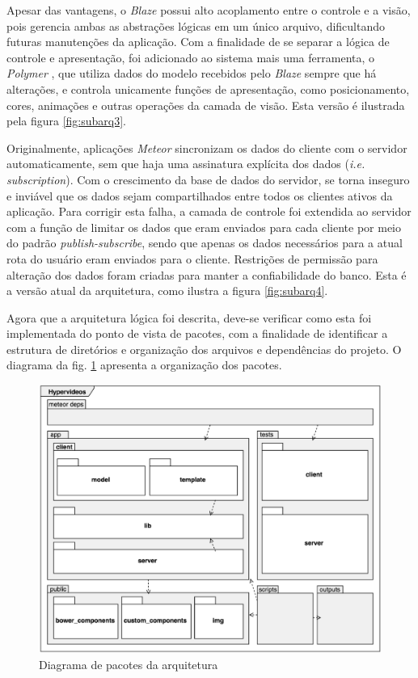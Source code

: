 Apesar das vantagens, o \textit{Blaze} possui alto acoplamento entre o controle e a visão, pois gerencia ambas as abstrações lógicas em um único arquivo, dificultando futuras manutenções da aplicação. Com a finalidade de se separar a lógica de controle e apresentação, foi adicionado ao sistema mais uma ferramenta, o \textit{Polymer} \cite{polymer2015}, que utiliza dados do modelo recebidos pelo \textit{Blaze} sempre que há alterações, e controla unicamente funções de apresentação, como posicionamento, cores, animações e outras operações da camada de visão. Esta versão é ilustrada pela figura \ref{fig:subarq3}.

Originalmente, aplicações \textit{Meteor} sincronizam os dados do cliente com o servidor automaticamente, sem que haja uma assinatura explícita dos dados (\textit{i.e. subscription}). Com o crescimento da base de dados do servidor, se torna inseguro e inviável que os dados sejam compartilhados entre todos os clientes ativos da aplicação. Para corrigir esta falha, a camada de controle foi extendida ao servidor com a função de limitar os dados que eram enviados para cada cliente por meio do padrão \textit{publish-subscribe}, sendo que apenas os dados necessários para a atual rota do usuário eram enviados para o cliente. Restrições de permissão para alteração dos dados foram criadas para manter a confiabilidade do banco. Esta é a versão atual da arquitetura, como ilustra a figura \ref{fig:subarq4}.

Agora que a arquitetura lógica foi descrita, deve-se verificar como esta foi implementada do ponto de vista de pacotes, com a finalidade de identificar a estrutura de diretórios e organização dos arquivos e dependências do projeto. O diagrama da fig. \ref{fig:arq_pacotes} apresenta a organização dos pacotes.

\begin{figure}[h!]
  	\centering
  	\includegraphics[width=.8\linewidth]{figuras/arq_pacotes.eps}
  	\caption{Diagrama de pacotes da arquitetura}
  	\label{fig:arq_pacotes}
\end{figure}

